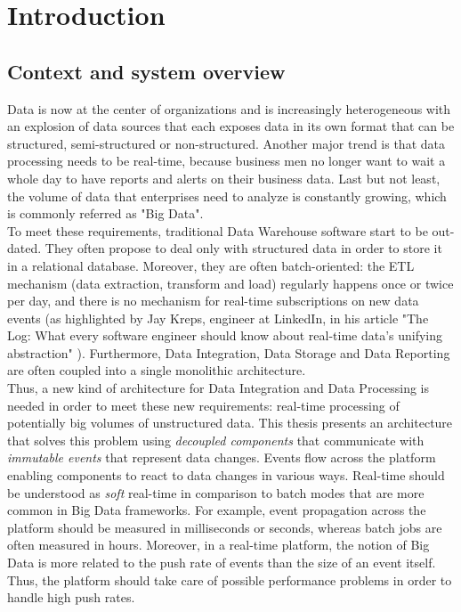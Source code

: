 \chapter{Introduction}

\section{Context and system overview}

Data is now at the center of organizations and is increasingly heterogeneous with an explosion of data sources 
that each exposes data in its own format that can be structured, semi-structured or non-structured.
Another major trend is that data processing needs to be real-time, because business men no longer want to wait a whole day 
to have reports and alerts on their business data. Last but not least, the volume of data that enterprises need to analyze is constantly growing, which is commonly referred as "Big Data".
\\

To meet these requirements, traditional Data Warehouse software start to be out-dated. They often
propose to deal only with structured data in order to store it in a relational database. Moreover, they are often batch-oriented: 
the ETL mechanism (data extraction, transform and load) regularly happens once or twice per day, and there is no mechanism 
for real-time subscriptions on new data events (as highlighted by Jay Kreps, engineer at LinkedIn, 
in his article "The Log: What every software engineer should know about real-time data's unifying abstraction" ). Furthermore,
Data Integration, Data Storage and Data Reporting are often coupled into a single monolithic architecture.
\\

Thus, a new kind of architecture for Data Integration and Data Processing is needed in order to meet these new requirements: real-time processing of potentially big volumes of unstructured data. This thesis presents an architecture that solves this problem using \textit{decoupled components} that communicate with \textit{immutable events} that represent data changes. Events flow across the platform enabling components to react to data changes in various ways. Real-time should be understood as \textit{soft} real-time in comparison to batch modes that are more common in Big Data frameworks. For example, event propagation across the platform should be measured in milliseconds or seconds, whereas batch jobs are often measured in hours. Moreover, in a real-time platform, the notion of Big Data is more related to the push rate of events than the size of an event itself. Thus, the platform should take care of possible performance problems in order to handle high push rates.

